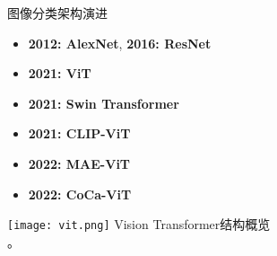 \begin{refsection}
  \begin{frame}{图像分类架构演进}
    \begin{minipage}{0.48\linewidth}
      {\small
      \begin{itemize}
        \item \textbf{2012: AlexNet}, \textbf{2016: ResNet}
        \item \textbf{2021: ViT} \\
        \parencite{dosovitskiyImageWorth16x162020}
        \item \textbf{2021: Swin Transformer} \\
        \parencite{liuSwinTransformerHierarchical2021}
        \item \textbf{2021: CLIP-ViT} \\
        \parencite{radfordLearningTransferableVisual2021}
        \item \textbf{2022: MAE-ViT} \\
        \parencite{heMaskedAutoencodersAre2022}
        \item \textbf{2022: CoCa-ViT} \\
        \parencite{yuCoCaContrastiveCaptioners2022}
      \end{itemize}
      }
    \end{minipage}%
    \hfill
    \begin{minipage}{0.48\linewidth}
      \centering
      \texttt{[image: vit.png]}
      \scriptsize Vision Transformer结构概览\\\parencite{dosovitskiyImageWorth16x162020}。
    \end{minipage}
    \bottomleftrefs
  \end{frame}
\end{refsection}



